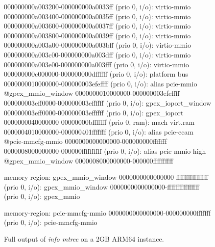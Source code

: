 \begin{figure}[ht]
\begin{minipage}{0.48\linewidth}
\begin{ffcode}
        000000000a003200-000000000a0033ff (prio 0, i/o): virtio-mmio
        000000000a003400-000000000a0035ff (prio 0, i/o): virtio-mmio
        000000000a003600-000000000a0037ff (prio 0, i/o): virtio-mmio
        000000000a003800-000000000a0039ff (prio 0, i/o): virtio-mmio
        000000000a003a00-000000000a003bff (prio 0, i/o): virtio-mmio
        000000000a003c00-000000000a003dff (prio 0, i/o): virtio-mmio
        000000000a003e00-000000000a003fff (prio 0, i/o): virtio-mmio
        000000000c000000-000000000dffffff (prio 0, i/o): platform bus
        0000000010000000-000000003efeffff (prio 0, i/o): alias pcie-mmio @gpex_mmio_window 0000000010000000-000000003efeffff
        000000003eff0000-000000003effffff (prio 0, i/o): gpex_ioport_window
          000000003eff0000-000000003effffff (prio 0, i/o): gpex_ioport
        0000000040000000-00000000bfffffff (prio 0, ram): mach-virt.ram
        0000004010000000-000000401fffffff (prio 0, i/o): alias pcie-ecam @pcie-mmcfg-mmio 0000000000000000-000000000fffffff
        0000008000000000-000000ffffffffff (prio 0, i/o): alias pcie-mmio-high @gpex_mmio_window 0000008000000000-000000ffffffffff

    memory-region: gpex_mmio_window
      0000000000000000-ffffffffffffffff (prio 0, i/o): gpex_mmio_window
        0000000000000000-ffffffffffffffff (prio 0, i/o): gpex_mmio

    memory-region: pcie-mmcfg-mmio
      0000000000000000-000000000fffffff (prio 0, i/o): pcie-mmcfg-mmio
  \end{ffcode}
  \end{minipage}
  \caption{Full output of \emph{info mtree} on a 2GB ARM64 instance.}
  \label{fig:mem_ARM_full}
\end{figure}

